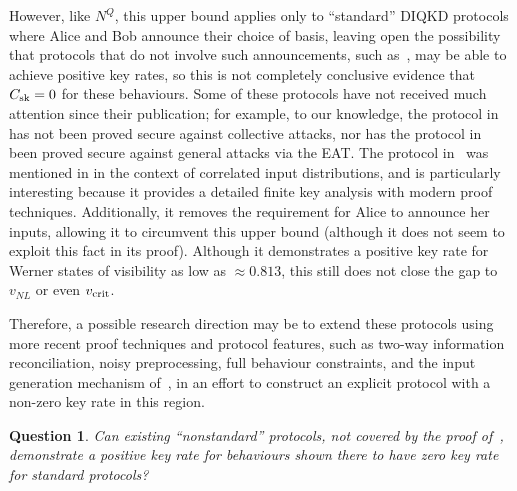 \documentclass[10pt, a4paper]{article}
\numberwithin{equation}{section} %
\theoremstyle{definition}
\theoremstyle{plain}
\newtheorem{question}{Question}
\newcommand{\?}{\mathrel{?}} %
\newcommand{\sk}{\rm sk}
\newcommand{\crit}{\rm crit}
\begin{document}
    However, like \(N^Q\), this upper bound applies only to ``standard'' DIQKD protocols where Alice and Bob announce their choice of basis, leaving open the possibility that protocols that do not involve such announcements, such as~\cites{NonstandardProtocol, DIQKD_MeasInputs}[Prot. 2]{DIQKD_FiniteSize}, may be able to achieve positive key rates, so this is not completely conclusive evidence that \(C_{\sk} = 0\) for these behaviours. Some of these protocols have not received much attention since their publication; for example, to our knowledge, the protocol in~\cite{NonstandardProtocol} has not been proved secure against collective attacks, nor has the protocol in~\cite{DIQKD_MeasInputs} been proved secure against general attacks via the EAT\@. The protocol in~\cite[Prot. 2]{DIQKD_FiniteSize} was mentioned in  in the context of correlated input distributions, and is particularly interesting because it provides a detailed finite key analysis with modern proof techniques. Additionally, it removes the requirement for Alice to announce her inputs, allowing it to circumvent this upper bound (although it does not seem to exploit this fact in its proof). Although it demonstrates a positive key rate for Werner states of visibility as low as \(\approx 0.813\), this still does not close the gap to \(v_{NL}\) or even \(v_{\crit}\).

    Therefore, a possible research direction may be to extend these protocols using more recent proof techniques and protocol features, such as two-way information reconciliation, noisy preprocessing, full behaviour constraints, and the input generation mechanism of~\cite[Prot. 2]{DIQKD_FiniteSize}, in an effort to construct an explicit protocol with a non-zero key rate in this region.
    \begin{question}
      Can existing ``nonstandard'' protocols, not covered by the proof of~\cite{NotSufficient}, demonstrate a positive key rate for behaviours shown there to have zero key rate for standard protocols?
    \end{question}
\end{document}
